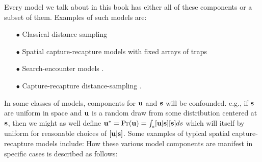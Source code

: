 Every model we talk about in this book has either all of these
components or a subset of them. Examples
of such models are:
\begin{enumerate}
\item[$\bullet$] Classical distance sampling
\item[$\bullet$] Spatial capture-recapture models with fixed arrays of traps
  \citep{efford:2004, borchers_efford:2008, royle_etal:2009,
    royle_etal:2009, gardner_etal:2010}
\item[$\bullet$] Search-encounter models \citep{royle_young:2008, royle_etal:2011}.
\item[$\bullet$] Capture-recapture distance-sampling \citep{borchers_etal:1998}.
\end{enumerate}
In some classes of models, components for ${\bf u}$ and ${\bf s}$ will be confounded.
e.g., if ${\bf s}$ are uniform in space and ${\bf u}$ is
a random draw from some distribution centered at ${\bf s}$, then we might as
well define ${\bf u}^{*}=\Pr({\bf u})=\int_{s} [{\bf u}|{\bf s}][{\bf
  s}]ds$ which will itself by uniform
for reasonable choices of $[{\bf u}|{\bf s}]$.  Some examples
of typical spatial capture-recapture models include:
How these various model components are manifest in specific cases is
described as follows:
